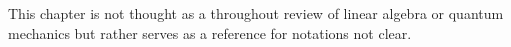 This chapter is not thought as a throughout review of linear algebra or quantum mechanics but rather serves as a reference for notations not clear.